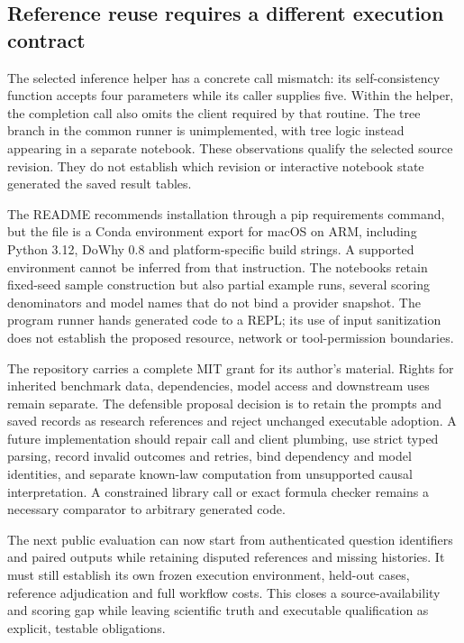 \subsection{Reference reuse requires a different execution contract}
\label{exec21:prophetsrepo-reuse}
The selected inference helper has a concrete call mismatch: its self-consistency
function accepts four parameters while its caller supplies five. Within the
helper, the completion call also omits the client required by that routine.
The tree branch in the common runner is unimplemented, with tree logic instead
appearing in a separate notebook. These observations qualify the selected
source revision. They do not establish which revision or interactive notebook
state generated the saved result tables.\citep{exec21_prophets_repo}

The README recommends installation through a pip requirements command, but the
file is a Conda environment export for macOS on ARM, including Python 3.12,
DoWhy 0.8 and platform-specific build strings. A supported environment cannot
be inferred from that instruction. The notebooks retain fixed-seed sample
construction but also partial example runs, several scoring denominators and
model names that do not bind a provider snapshot. The program runner hands
generated code to a REPL; its use of input sanitization does not establish the
proposed resource, network or tool-permission boundaries.
\citep{exec21_prophets_repo}

The repository carries a complete MIT grant for its author's material. Rights
for inherited benchmark data, dependencies, model access and downstream uses
remain separate. The defensible proposal decision is to retain the prompts
and saved records as research references and reject unchanged executable
adoption. A future implementation should repair call and client plumbing,
use strict typed parsing, record invalid outcomes and retries, bind dependency
and model identities, and separate known-law computation from unsupported
causal interpretation. A constrained library call or exact formula checker
remains a necessary comparator to arbitrary generated code.
\citep{exec21_prophets_repo}

The next public evaluation can now start from authenticated question identifiers
and paired outputs while retaining disputed references and missing histories.
It must still establish its own frozen execution environment, held-out cases,
reference adjudication and full workflow costs. This closes a source-availability
and scoring gap while leaving scientific truth and executable qualification as
explicit, testable obligations.
